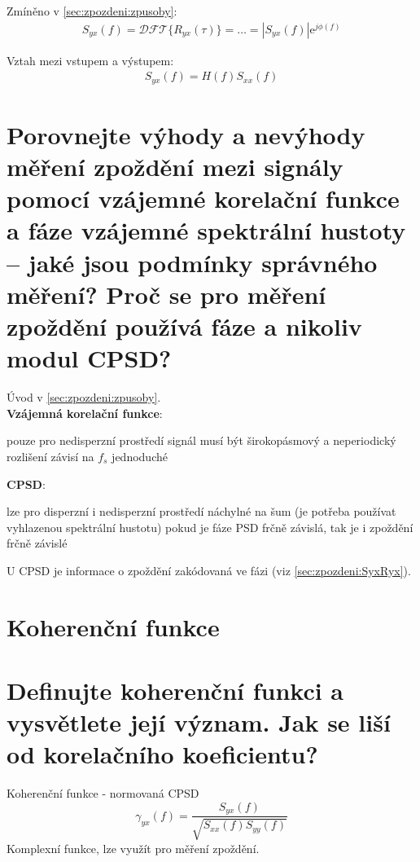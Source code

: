 \documentclass[a4paper,12pt]{article}   %
\newcommand{\mt}[1]{$#1$}
\newcommand{\e}{\text{e}}
\begin{document}
Zmíněno v \ref{sec:zpozdeni:zpusoby}:
\begin{align*}
        S_{yx}(f) = \mathscr{DFT}\{R_{yx}(\tau)\} = \dots = |S_{yx}(f)|\e^{j\phi(f)}
\end{align*}

Vztah mezi vstupem a výstupem:
\begin{align*}
        S_{yx}(f) = H(f) S_{xx}(f) 
\end{align*}



\section{Porovnejte výhody a nevýhody měření zpoždění mezi signály pomocí vzájemné korelační funkce a fáze vzájemné spektrální hustoty – jaké jsou podmínky správného měření? Proč se pro měření zpoždění používá fáze a nikoliv modul CPSD?}
Úvod v \ref{sec:zpozdeni:zpusoby}.\\
\textbf{Vzájemná korelační funkce}:
\begin{outline}
        \1 pouze pro nedisperzní prostředí 
        \1 signál musí být širokopásmový a neperiodický
        \1 rozlišení závisí na \mt{f_s}
        \1 jednoduché
\end{outline}

\textbf{CPSD}:
\begin{outline}
        \1 lze pro disperzní i nedisperzní prostředí
        \1 náchylné na šum (je potřeba používat vyhlazenou spektrální hustotu)
        \1 pokud je fáze PSD frčně závislá, tak je i zpoždění frčně závislé
\end{outline}

U CPSD je informace o zpoždění zakódovaná ve fázi (viz \ref{sec:zpozdeni:SyxRyx}).





\clearpage 

\section*{Koherenční funkce}
\section{Definujte koherenční funkci a vysvětlete její význam. Jak se liší od korelačního koeficientu?}
Koherenční funkce - normovaná CPSD
\begin{equation}
        \gamma_{yx}(f) = \frac{S_{yx}(f)}{\sqrt{S_{xx}(f)S_{yy}(f)}}
\end{equation}
Komplexní funkce, lze využít pro měření zpoždění.
\end{document}
